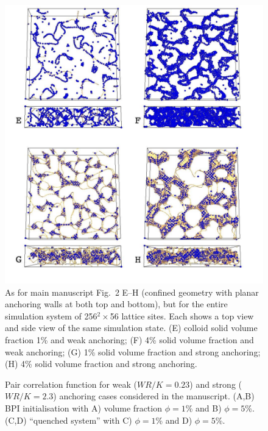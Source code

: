 \documentclass[12pt,twoside]{article}
\begin{document}
\begin{figure}[t]
\begin{center}
\includegraphics[scale=0.42]{support-fig5.pdf}
\end{center}
\caption{As for main manuscript Fig.~2 E--H (confined geometry with planar
anchoring walls at both top and bottom), but for the entire simulation
system of 256$^2\times$56 lattice sites. Each shows a top view and
side view of the same simulation state. (E) colloid solid volume fraction 1\%
and weak anchoring; (F) 4\% solid volume fraction and weak anchoring;
(G) 1\% solid volume fraction and strong anchoring; (H) 4\% solid
volume fraction and strong anchoring.}
\end{figure}

\begin{figure}[t]
\begin{center}
\end{center}
\caption{Pair correlation function for weak ($WR/K=0.23$) and strong ($WR/K=2.3$) anchoring cases considered in the manuscript. (A,B) BPI initialisation with A) volume fraction $\phi=1${\%} and B) $\phi=5${\%}. (C,D) ``quenched system'' with C) $\phi=1${\%} and D) $\phi=5${\%}.}
\end{figure}



\end{document}

